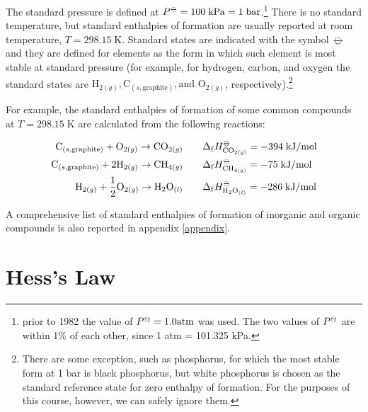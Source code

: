 \documentclass[
  9pt,
]{extbook}
\theoremstyle{definition}
\theoremstyle{definition}
\theoremstyle{definition}
\theoremstyle{remark}
\begin{document}
The standard pressure is defined at \(P^{{-\kern-6pt{\ominus}\kern-6pt-}} = 100 \; \mathrm{kPa} = 1 \; \mathrm{bar}\).\footnote{prior to 1982 the value of \(P^{{-\kern-6pt{\ominus}\kern-6pt-}} = 1.0 \mathrm{ atm}\) was used. The two values of \(P^{-\kern-6pt{\ominus}\kern-6pt-}\) are within 1\% of each other, since 1 atm = 101.325 kPa.} There is no standard temperature, but standard enthalpies of formation are usually reported at room temperature, \(T = 298.15 \; \mathrm{K}\). Standard states are indicated with the symbol \({-\kern-6pt{\ominus}\kern-6pt-}\) and they are defined for elements as the form in which such element is most stable at standard pressure (for example, for hydrogen, carbon, and oxygen the standard states are \(\mathrm{H}_{2(g)}, \mathrm{C}_{(s,\text{graphite})}, \text{and }\mathrm{O}_{2(g)}\), respectively).\footnote{There are some exception, such as phosphorus, for which the most stable form at 1 bar is black phosphorus, but white phosphorus is chosen as the standard reference state for zero enthalpy of formation. For the purposes of this course, however, we can safely ignore them.}

For example, the standard enthalpies of formation of some common compounds at \(T = 298.15 \; \mathrm{K}\) are calculated from the following reactions:

\begin{equation}
\begin{aligned}
  \mathrm{C}_{(s,\text{graphite})}+\mathrm{O}_{2(g)} \rightarrow \mathrm{CO}_{2(g)} \qquad & \Delta_{\mathrm{f}} H_{\mathrm{CO}_{2(g)}}^{-\kern-6pt{\ominus}\kern-6pt-}= -394 \; \text{kJ/mol} \\
   \mathrm{C}_{(s,\text{graphite})}+2 \mathrm{H}_{2(g)} \rightarrow \mathrm{CH}_{4(g)} \qquad & \Delta_{\mathrm{f}} H_{\mathrm{CH}_{4(g)}}^{-\kern-6pt{\ominus}\kern-6pt-}= -75 \; \text{kJ/mol} \\ 
   \mathrm{H}_{2(g)}+\frac{1}{2} \mathrm{O}_{2(g)} \rightarrow \mathrm{H}_2 \mathrm{O}_{(l)} \qquad & \Delta_{\mathrm{f}} H_{\mathrm{H}_2 \mathrm{O}_{(l)}}^{-\kern-6pt{\ominus}\kern-6pt-}= -286 \; \text{kJ/mol} 
\end{aligned}
\label{eq:someDfH}
\end{equation}

A comprehensive list of standard enthalpies of formation of inorganic and organic compounds is also reported in appendix \ref{appendix}.

\hypertarget{hessslaw}{%
\section{Hess's Law}\label{hessslaw}}
\end{document}
